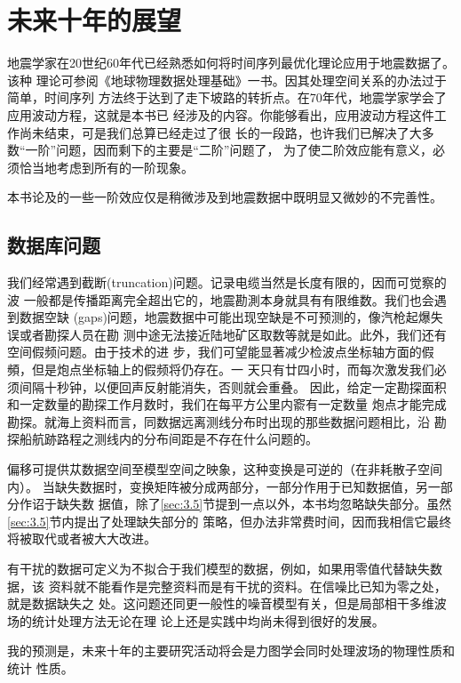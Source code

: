 \section{未来十年的展望}
\label{sec:5.8}

地震学家在20世纪60年代已经熟悉如何将时间序列最优化理论应用于地震数据了。该种
理论可参阅《地球物理数据处理基础》一书。因其处理空间关系的办法过于简单，时间序列
方法终于达到了走下坡路的转折点。在70年代，地震学家学会了应用波动方程，这就是本书已
经涉及的内容。你能够看出，应用波动方程这件工作尚未结束，可是我们总算已经走过了很
长的一段路，也许我们已解决了大多数“一阶”问题，因而剩下的主要是“二阶”问题了，
为了使二阶效应能有意义，必须恰当地考虑到所有的一阶现象。

本书论及的一些一阶效应仅是稍微涉及到地震数据中既明显又微妙的不完善性。

\subsection{数据库问题}
\label{sec:5.8.1}

我们经常遇到截断(truncation)问题。记录电缆当然是长度有限的，因而可觉察的波
一般都是传播距离完全超出它的，地震勘測本身就具有有限维数。我们也会遇到数据空缺
(gaps)问题，地震数据中可能出现空缺是不可预测的，像汽枪起爆失误或者勘探人员在勘
测中途无法接近陆地矿区取数等就是如此。此外，我们还有空间假频问题。由于技术的进
步，我们可望能显著减少检波点坐标轴方面的假頻，但是炮点坐标轴上的假频将仍存在。一
天只有廿四小时，而每次激发我们必须间隔十秒钟，以便回声反射能消失，否则就会重叠。
因此，给定一定勘探面积和一定数量的勘探工作月数时，我们在每平方公里内窬有一定数量
炮点才能完成勘探。就海上资料而言，同数据远离测线分布时出现的那些数据问题相比，沿
勘探船航跡路程之测线内的分布间距是不存在什么问题的。

偏移可提供苁数据空间至模型空间之映象，这种变换是可逆的（在非耗散子空间内）。
当缺失数据时，变换矩阵被分成两部分，一部分作用于已知数据值，另一部分作诏于缺失数
据值，除了\ref{sec:3.5}节提到一点以外，本书均忽略缺失部分。虽然\ref{sec:3.5}节内提出了处理缺失部分的
策略，但办法非常费时间，因而我相信它最终将被取代或者被大大改进。

有干扰的数据可定义为不拟合于我们模型的数据，例如，如果用零值代替缺失数据，该
资料就不能看作是完整资料而是有干扰的资料。在信噪比已知为零之处，就是数据缺失之
处。这问题还同更一般性的噪音模型有关，但是局部相干多维波场的统计处理方法无论在理
论上还是实践中均尚未得到很好的发展。

我的预测是，未来十年的主要研究活动将会是力图学会同时处理波场的物理性质和统计
性质。


